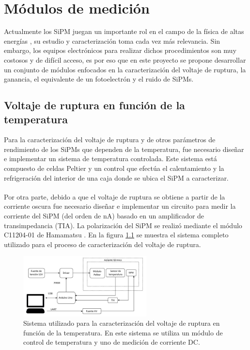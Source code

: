 \chapter{Módulos de medición}
\label{Cap:Modulos}
Actualmente los SiPM juegan un importante rol en el campo de la física de altas energías \citep{Intro_SIPM_Sensl}, su estudio y caracterización toma cada vez más relevancia. Sin embargo, los equipos electrónicos para realizar dichos procedimientos son muy costosos y de difícil acceso, es por eso que en este proyecto se propone desarrollar un conjunto de módulos enfocados en la caracterización del voltaje de ruptura, la ganancia, el equivalente de un fotoelectrón y el ruido de SiPMs.  
\section{Voltaje de ruptura en función de la temperatura}
Para la caracterización del voltaje de ruptura y de otros parámetros de rendimiento de los SiPMs que dependen de la temperatura, fue necesario diseñar e implementar un sistema de temperatura controlada. Este sistema está compuesto de celdas Peltier y un control que efectúa el calentamiento y la refrigeración del interior de una caja donde se ubica el SiPM a caracterizar.\\ \\
Por otra parte, debido a que el  voltaje de ruptura se obtiene a partir de la corriente oscura fue necesario diseñar e  implementar un circuito para medir la corriente del SiPM (del orden de nA) basado en un amplificador de transimpedancia (TIA). La polarización del SiPM se realizó mediante el módulo C11204-01 de Hamamatsu \citep{Driver_mppc}. En la figura \ref{fig:complete_system} se muestra el sistema completo utilizado para el proceso de caracterización del voltaje de ruptura.
\begin{figure}[h!]
\begin{centering}
  \includegraphics[width=0.6\textwidth]{Images/Sistema_Completo_ruptura}
  \caption{Sistema utilizado para la caracterización del voltaje de ruptura en función de la temperatura. En este sistema se utiliza un módulo de control de temperatura y uno de medición de corriente DC.}
  \label{fig:complete_system}
  \par\end{centering}
\end{figure}

